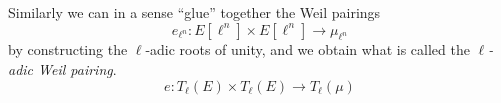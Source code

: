Similarly we can in a sense ``glue'' together the Weil pairings
$$ e_{\ell^n} : E[\ell^n] \times E[\ell^n] \rightarrow \mu_{\ell^n} $$
by constructing the $\ell$-adic roots of unity, and we obtain what is called the
\emph{$\ell$-adic Weil pairing}.
$$ e: T_\ell(E) \times T_\ell(E) \rightarrow T_\ell(\mu) $$
